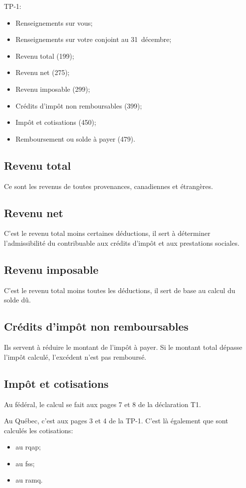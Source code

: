 TP-1:
\qc
\begin{itemize}
	\item Renseignements sur vous;
	\item Renseignements sur votre conjoint au 31~décembre;
	\item Revenu total (199);
	\item Revenu net (275);
	\item Revenu imposable (299);
	\item Crédits d'impôt non remboursables (399);
	\item Impôt et cotisations (450);
	\item Remboursement ou solde à payer (479).
\end{itemize}


\subsection{Revenu total}
Ce sont les revenus de toutes provenances, canadiennes et étrangères.


\subsection{Revenu net}
C'est le revenu total moins certaines déductions, il sert à déterminer l'admissibilité du contribuable aux crédits d'impôt et aux prestations sociales.


\subsection{Revenu imposable}
C'est le revenu total moins toutes les déductions, il sert de base au calcul du solde dû.


\subsection{Crédits d'impôt non remboursables}
Ils servent à réduire le montant de l'impôt à payer. Si le montant total dépasse l'impôt calculé, l'excédent n'est pas remboursé.


\subsection{Impôt et cotisations}
Au fédéral, le calcul se fait aux pages 7 et 8 de la déclaration T1.

Au Québec, c'est aux pages 3 et 4 de la TP-1. C'est là également que sont calculés les cotisations:
\begin{itemize}
	\item au \acrfull{rqap};
	\item au \acrfull{fss};
	\item au \acrfull{ramq}.
\end{itemize}


